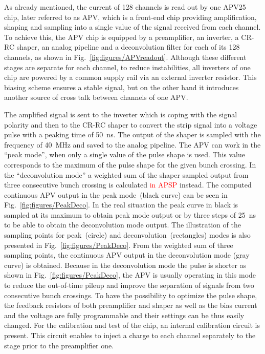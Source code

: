 As already mentioned, the current of 128 channels is read out by one APV25~\cite{French:2001xb} chip, later referred to as APV, which is a front-end chip providing amplification, shaping and sampling into a single value of the signal received from each channel. To achieve this, the APV chip is equipped by a preamplifier, an inverter, a CR-RC shaper, an analog pipeline and a deconvolution filter for each of its 128 channels, as shown in Fig.~\ref{fig:figures/APVreadout}. Although these different stages are separate for each channel, to reduce instabilities, all inverters of one chip are powered by a common supply rail via an external inverter resistor. This biasing scheme ensures a stable signal, but on the other hand it introduces another source of cross talk between channels of one APV.

The amplified signal is sent to the inverter which is coping with the signal polarity and then to the CR-RC shaper to convert the strip signal into a voltage pulse with a peaking time of 50~ns. The output of the shaper is sampled with the frequency of 40~MHz and saved to the analog pipeline. The APV can work in the ``peak mode'', when only a single value of the pulse shape is used. This value corresponds to the maximum of the pulse shape for the given bunch crossing. In the ``deconvolution mode'' a weighted sum of the shaper sampled output from three consecutive bunch crossing is calculated \textcolor{red}{in APSP} instead. The computed continuous APV output in the peak mode~(black curve) can be seen in Fig.~\ref{fig:figures/PeakDeco}. In the real situation the peak curve in black is sampled at its maximum to obtain peak mode output or by three steps of 25~ns to be able to obtain the deconvolution mode output. The illustration of the sampling points for peak~(circle) and deconvolution~(rectangles) modes is also presented in Fig.~\ref{fig:figures/PeakDeco}. From the weighted sum of three sampling points, the continuous APV output in the deconvolution mode (gray curve) is obtained. Because in the deconvolution mode the pulse is shorter as shown in Fig.~\ref{fig:figures/PeakDeco}, the APV is usually operating in this mode to reduce the out-of-time pileup and improve the separation of signals from two consecutive bunch crossings. To have the possibility to optimize the pulse shape, the feedback resistors of both preamplifier and shaper as well as the bias current and the voltage are fully programmable and their settings can be thus easily changed. For the calibration and test of the chip, an internal calibration circuit is present. This circuit enables to inject a charge to each channel separately to the stage prior to the preamplifier one.


